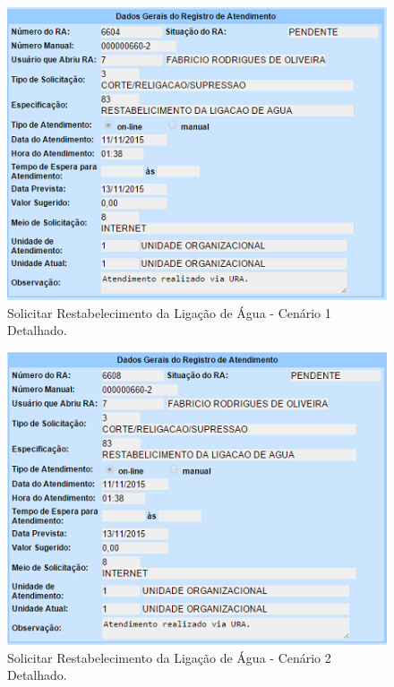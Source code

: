 \begin{anexosenv}
\begin{figure}[H]
	\centering
	\caption{Solicitar Restabelecimento da Ligação de Água - Cenário 1 Detalhado.}
	\includegraphics{figuras/anexo/restabelecer/detalhe_1.png}
\end{figure}

\begin{figure}[H]
	\centering
	\caption{Solicitar Restabelecimento da Ligação de Água - Cenário 2 Detalhado.}
	\includegraphics{figuras/anexo/restabelecer/detalhe_2.png}
\end{figure}


\end{anexosenv}
